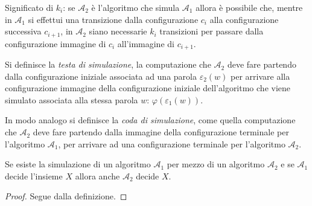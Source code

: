 \begin{rema}
Significato di $k_i$: se $\mathcal{A}_2$ è l'algoritmo che simula $\mathcal{A}_1$ allora è possibile che, mentre in $\mathcal{A}_1$ si effettui una transizione dalla configurazione $c_i$ alla configurazione successiva $c_{i+1}$, in $\mathcal{A}_2$ siano necessarie $k_i$ transizioni per passare dalla configurazione immagine di $c_i$ all'immagine di $c_{i+1}$.
\end{rema}

\begin{defi}
Si definisce la \emph{testa di simulazione}, la computazione che $\mathcal{A}_2$ deve fare partendo dalla configurazione iniziale associata ad una parola $\varepsilon_2(w)$ per arrivare alla configurazione immagine della configurazione iniziale dell'algoritmo che viene simulato associata alla stessa parola $w$: $\varphi(\varepsilon_1(w))$.

In modo analogo si definisce la \emph{coda di simulazione}, come quella computazione che $\mathcal{A}_2$ deve fare partendo dalla immagine della configurazione terminale per l'algoritmo $\mathcal{A}_1$, per arrivare ad una configurazione terminale per l'algoritmo $\mathcal{A}_2$.
\end{defi}

\begin{lemm}\label{simulazione e decidibilità}
Se esiste la simulazione di un algoritmo $\mathcal{A}_1$ per mezzo di un algoritmo $\mathcal{A}_2$ e se $\mathcal{A}_1$ decide l'insieme $X$ allora anche $\mathcal{A}_2$ decide $X$.
\begin{proof}
Segue dalla definizione.
\end{proof}
\end{lemm}




